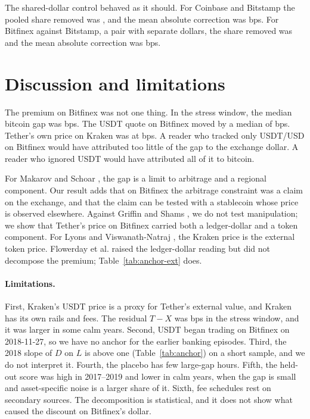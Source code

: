 \documentclass[preprint,10pt]{elsarticle}
\begin{document}
The shared-dollar control behaved as it should. For Coinbase and Bitstamp the pooled share removed was \NumPCtrlCbBstPooledEst{}, and the mean absolute correction was \NumPCtrlCbBstPooledAbsEst{} bps. For Bitfinex against Bitstamp, a pair with separate dollars, the share removed was \NumPCtrlBfxBstPooledEst{} and the mean absolute correction was \NumPCtrlBfxBstPooledAbsEst{} bps.

\section{Discussion and limitations}
The premium on Bitfinex was not one thing. In the stress window, the median bitcoin gap was \NumKStressMedL{} bps. The USDT quote on Bitfinex moved by a median of \NumUAnchorStressD{} bps. Tether's own price on Kraken was at \NumKStressMedX{} bps. A reader who tracked only USDT/USD on Bitfinex would have attributed too little of the gap to the exchange dollar. A reader who ignored USDT would have attributed all of it to bitcoin.

For Makarov and Schoar \citep{makarov2020trading}, the gap is a limit to arbitrage and a regional component. Our result adds that on Bitfinex the arbitrage constraint was a claim on the exchange, and that the claim can be tested with a stablecoin whose price is observed elsewhere. Against Griffin and Shams \citep{griffin2020untethered}, we do not test manipulation; we show that Tether's price on Bitfinex carried both a ledger-dollar and a token component. For Lyons and Viswanath-Natraj \citep{lyons2023keeps}, the Kraken price is the external token price. Flowerday et al. \citep{flowerday2026bitcoin} raised the ledger-dollar reading but did not decompose the premium; Table~\ref{tab:anchor-ext} does.

\paragraph{Limitations.} First, Kraken's USDT price is a proxy for Tether's external value, and Kraken has its own rails and fees. The residual $T-X$ was \NumKStressMedTmX{} bps in the stress window, and it was larger in some calm years. Second, USDT began trading on Bitfinex on 2018-11-27, so we have no anchor for the earlier banking episodes. Third, the 2018 slope of $D$ on $L$ is above one (Table~\ref{tab:anchor}) on a short sample, and we do not interpret it. Fourth, the placebo has few large-gap hours. Fifth, the held-out score was high in 2017--2019 and lower in calm years, when the gap is small and asset-specific noise is a larger share of it. Sixth, fee schedules rest on secondary sources. The decomposition is statistical, and it does not show what caused the discount on Bitfinex's dollar.
\end{document}

